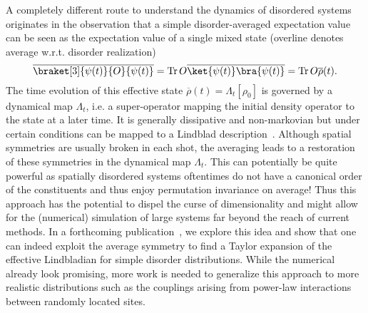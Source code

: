 A completely different route to understand the dynamics of disordered systems originates in the observation that a simple disorder-averaged expectation value can be seen as the expectation value of a single mixed state (overline denotes average w.r.t. disorder realization)
\begin{equation}
	\overline{\braket[3]{\psi(t)}{O}{\psi(t)}} = \Tr O \overline{\ket{\psi(t)}\bra{\psi(t)}} = \Tr O \overline{\rho}(t).
\end{equation}
The time evolution of this effective state $\overline{\rho}(t) = \Lambda_t[\rho_0]$ is governed by a dynamical map $\Lambda_t$, i.e. a super-operator mapping the initial density operator to the state at a later time. It is generally dissipative and non-markovian but under certain conditions can be mapped to a Lindblad description~\cite{kropfEffectiveDynamicsDisordered2016,gneitingIncoherentEnsembleDynamics2016,chenSimulatingOpenQuantum2018,gneitingDisorderdressedQuantumEvolution2020}. 
Although spatial symmetries are usually broken in each shot, the averaging leads to a restoration of these symmetries in the dynamical map $\Lambda_t$. This can potentially be quite powerful as spatially disordered systems oftentimes do not have a canonical order of the constituents and thus enjoy permutation invariance on average! Thus this approach has the potential to dispel the curse of dimensionality and might allow for the (numerical) simulation of large systems far beyond the reach of current methods. In a forthcoming publication~\cite{erpeldingSymmetries}, we explore this idea and show that one can indeed exploit the average symmetry to find a Taylor expansion of the effective Lindbladian for simple disorder distributions. While the numerical already look promising, more work is needed to generalize this approach to more realistic distributions such as the couplings arising from power-law interactions between randomly located sites.


